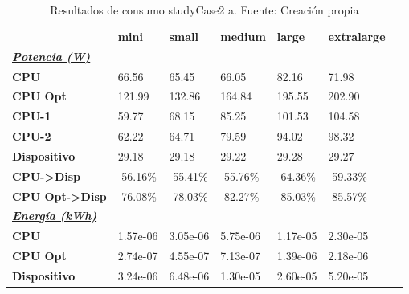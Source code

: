 \begin{table}[H]
    \centering
    \begin{tabular}{lllllll}
    \rowcolor[HTML]{DAE8FC} \ & \textbf{mini} & \textbf{small} & \textbf{medium} & \textbf{	large} & \textbf{	extralarge} \\
    \cellcolor[HTML]{DAE8FC} \textbf{\textbf{{\emph{{\underline{{Potencia (W)}}}}}}} &  &  &  & 	 & 	 \\
    \rowcolor[HTML]{EFEFEF} \cellcolor[HTML]{DAE8FC} \textbf{CPU} & 66.56 & 65.45 & 66.05 & 	82.16 & 	71.98 \\
    \cellcolor[HTML]{DAE8FC} \textbf{CPU Opt} & 121.99 & 132.86 & 164.84 & 	195.55 & 	202.90 \\
    \rowcolor[HTML]{EFEFEF} \cellcolor[HTML]{DAE8FC} \textbf{\quad CPU-1} & 59.77 & 68.15 & 85.25 & 	101.53 & 	104.58 \\
    \cellcolor[HTML]{DAE8FC} \textbf{\quad CPU-2} & 62.22 & 64.71 & 79.59 & 	94.02 & 	98.32 \\
    \rowcolor[HTML]{EFEFEF} \cellcolor[HTML]{DAE8FC} \textbf{Dispositivo} & 29.18 & 29.18 & 29.22 & 	29.28 & 	29.27 \\
    \cellcolor[HTML]{DAE8FC} \textbf{CPU->Disp} & -56.16\% & -55.41\% & -55.76\% & 	-64.36\% & 	-59.33\% \\
    \rowcolor[HTML]{EFEFEF} \cellcolor[HTML]{DAE8FC} \textbf{CPU Opt->Disp} & -76.08\% & -78.03\% & -82.27\% & 	-85.03\% & 	-85.57\% \\
    \cellcolor[HTML]{DAE8FC} \textbf{\textbf{{\emph{{\underline{{Energía (kWh)}}}}}}} &  &  &  & 	 & 	 \\
    \rowcolor[HTML]{EFEFEF} \cellcolor[HTML]{DAE8FC} \textbf{CPU} & 1.57e-06 & 3.05e-06 & 5.75e-06 & 	1.17e-05 & 	2.30e-05 \\
    \cellcolor[HTML]{DAE8FC} \textbf{CPU Opt} & 2.74e-07 & 4.55e-07 & 7.13e-07 & 	1.39e-06 & 	2.18e-06 \\
    \rowcolor[HTML]{EFEFEF} \cellcolor[HTML]{DAE8FC} \textbf{Dispositivo} & 3.24e-06 & 6.48e-06 & 1.30e-05 & 	2.60e-05 & 	5.20e-05 \\
    \end{tabular}
    \caption[Resultados de consumo studyCase2 a]{{Resultados de consumo studyCase2 a. Fuente: Creación propia}}
    \label{table_test_studyCase2_a_hw_powerResults}
\end{table}